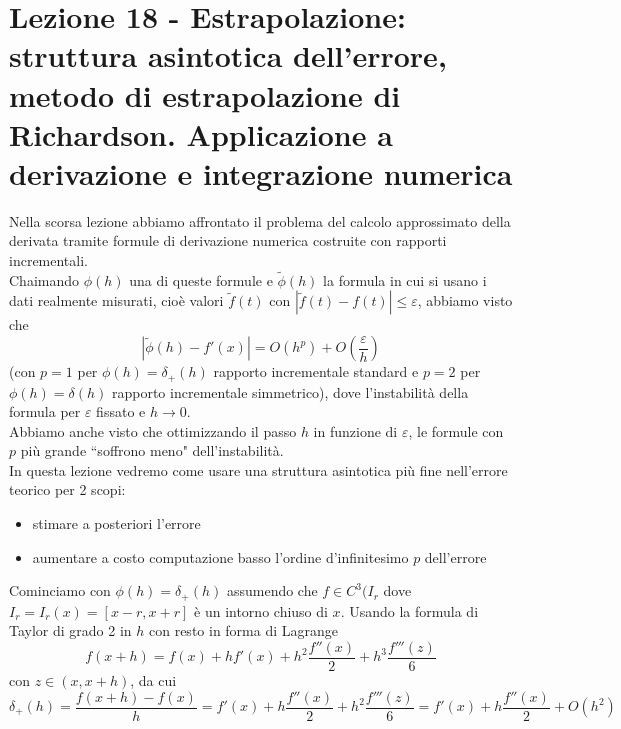 \documentclass[12pt,a4paper]{article}
\begin{document}
\section[Lezione 18 - Estrapolazione]{Lezione 18 - Estrapolazione: struttura asintotica dell'errore, metodo di estrapolazione di Richardson. Applicazione a derivazione e integrazione numerica}
Nella scorsa lezione abbiamo affrontato il problema del calcolo approssimato della derivata tramite formule di derivazione numerica costruite con rapporti incrementali.\\Chaimando $\phi(h)$ una di queste
formule e $\tilde{\phi}(h)$ la formula in cui si usano i dati realmente misurati, cioè valori $\tilde{f}(t)$ con $|\tilde{f}(t)-f(t)|\leq\varepsilon$, abbiamo visto che
\begin{equation*}
    |\tilde{\phi}(h)-f'(x)|=O(h^p)+O(\frac{\varepsilon}{h})
\end{equation*}
(con $p=1$ per $\phi(h)=\delta_+(h)$ rapporto incrementale standard e $p=2$ per $\phi(h)=\delta(h)$ rapporto incrementale simmetrico), dove l'instabilità della formula per $\varepsilon$ fissato e $h\rightarrow0$.\\
Abbiamo anche visto che ottimizzando il passo $h$ in funzione di $\varepsilon$, le formule con $p$ più grande ``soffrono meno" dell'instabilità. \\In questa lezione vedremo come usare una struttura asintotica più fine nell'errore teorico per 2 scopi:
\begin{itemize}
    \item stimare a posteriori l'errore
    \item aumentare a costo computazione basso l'ordine d'infinitesimo $p$ dell'errore
\end{itemize}
Cominciamo con $\phi(h)=\delta_+(h)$ assumendo che $f\in C^3(I_r$ dove $I_r=I_r(x)=[x-r,x+r]$ è un intorno chiuso di $x$. Usando la formula di Taylor di grado 2 in $h$ con resto in forma di Lagrange
\begin{equation*}
    f(x+h)=f(x)+hf'(x)+h^2\frac{f''(x)}{2}+h^3\frac{f'''(z)}{6}
\end{equation*}
con $z\in (x,x+h)$, da cui 
\begin{equation*}
    \delta_+(h)=\frac{f(x+h)-f(x)}{h}=f'(x)+h\frac{f''(x)}{2}+h^2\frac{f'''(z)}{6}=f'(x)+h\frac{f''(x)}{2}+O(h^2)
\end{equation*}
\end{document}
